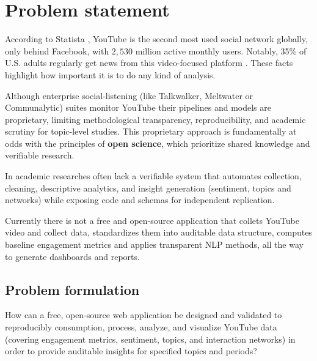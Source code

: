 \section{Problem statement}


According to Statista \cite{statista2025social}, YouTube is the second most used social network globally, only behind Facebook, with $2,530$ million active monthly users. Notably, 35\% of U.S. adults regularly get news from this video-focused platform \cite{pewresearch2025social}. These facts highlight how important it is to do any kind of analysis.

Although enterprise social-listening (like Talkwalker, Meltwater or Communalytic) suites monitor YouTube their pipelines and models are proprietary, limiting methodological transparency, reproducibility, and academic scrutiny for topic-level studies. This proprietary approach is fundamentally at odds with the principles of \textbf{open science}, which prioritize shared knowledge and verifiable research.

In academic researches often lack a verifiable system that automates collection, cleaning, descriptive analytics, and insight generation (sentiment, topics and networks) while exposing code and schemas for independent replication.

Currently there is not a free and open-source application that collets YouTube video and collect data, standardizes them into auditable data structure, computes baseline engagement metrics and applies transparent NLP methods, all the way to generate dashboards and reports.

\subsection{Problem formulation}

How can a free, open-source web application be designed and validated to reproducibly consumption, process, analyze, and visualize YouTube data (covering engagement metrics, sentiment, topics, and interaction networks) in order to provide auditable insights for specified topics and periods?
